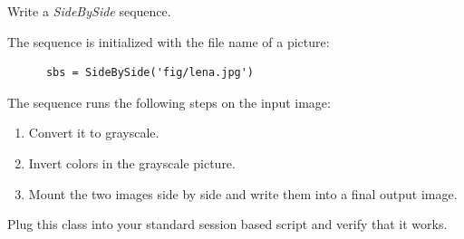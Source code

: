 \documentclass[english,serif,mathserif,xcolor=pdftex,dvipsnames,table]{beamer}
\begin{document}
\begin{frame}[fragile]
  \begin{exercise}
    Write a \emph{SideBySide} sequence.

    \+
    The sequence is initialized with the file name of a picture:
    \begin{lstlisting}
      sbs = SideBySide('fig/lena.jpg')
    \end{lstlisting}

    \+
    The sequence runs the following steps on the input image:
    \begin{enumerate}
    \item Convert it to grayscale.
    \item Invert colors in the grayscale picture.
    \item Mount the two images side by side and write them into a final output image.
    \end{enumerate}

    \+
    Plug this class into your standard session based script and
    verify that it works.
  \end{exercise}
\end{frame}
\end{document}
